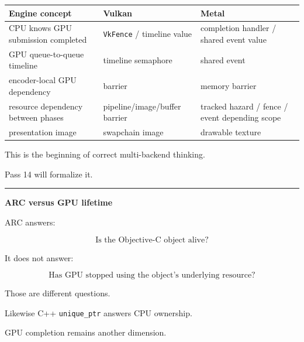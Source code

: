{\def\LTcaptype{none} %
\begin{longtable}[]{@{}
  >{\raggedright\arraybackslash}p{}
  >{\raggedright\arraybackslash}p{}
  >{\raggedright\arraybackslash}p{}@{}}
\toprule\noalign{}
\begin{minipage}[b]{\linewidth}\raggedright
Engine concept
\end{minipage} & \begin{minipage}[b]{\linewidth}\raggedright
Vulkan
\end{minipage} & \begin{minipage}[b]{\linewidth}\raggedright
Metal
\end{minipage} \\
\midrule\noalign{}
\endhead
\bottomrule\noalign{}
\endlastfoot
CPU knows GPU submission completed & \texttt{VkFence} / timeline value & completion handler / shared event value \\
GPU queue-to-queue timeline & timeline semaphore & shared event \\
encoder-local GPU dependency & barrier & memory barrier \\
resource dependency between phases & pipeline/image/buffer barrier & tracked hazard / fence / event depending scope \\
presentation image & swapchain image & drawable texture \\
\end{longtable}
}

This is the beginning of correct multi-backend thinking.

Pass 14 will formalize it.

\begin{center}\rule{0.5\linewidth}{0.5pt}\end{center}

\textbf{ARC versus GPU lifetime}

ARC answers:

\[
\boxed{
\text{Is the Objective-C object alive?}
}
\]

It does not answer:

\[
\boxed{
\text{Has GPU stopped using the object's underlying resource?}
}
\]

Those are different questions.

Likewise C++ \texttt{unique\_ptr} answers CPU ownership.

GPU completion remains another dimension.

